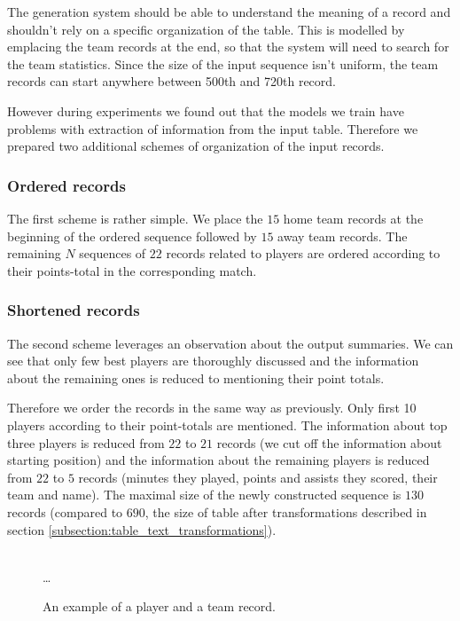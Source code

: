 The generation system should be able to understand the meaning of a record and shouldn't rely on a specific organization of the table. This is modelled by emplacing the team records at the end, so that the system will need to search for the team statistics. Since the size of the input sequence isn't uniform, the team records can start anywhere between 500th and 720th record.

However during experiments we found out that the models we train have problems with extraction of information from the input table. Therefore we prepared two additional schemes of organization of the input records.

\subsubsection{Ordered records} \label{subsubsection:ordered_records}

The first scheme is rather simple. We place the $15$ home team records at the beginning of the ordered sequence followed by $15$ away team records. The remaining $N$ sequences of $22$ records related to players are ordered according to their points-total in the corresponding match.

\subsubsection{Shortened records} \label{subsubsection:shortened records}

The second scheme leverages an observation about the output summaries. We can see that only few best players are thoroughly discussed and the information about the remaining ones is reduced to mentioning their point totals.

Therefore we order the records in the same way as previously. Only first 10 players according to their point-totals are mentioned. The information about top three players is reduced from $22$ to $21$ records (we cut off the information about starting position) and the information about the remaining players is reduced from $22$ to $5$ records (minutes they played, points and assists they scored, their team and name). The maximal size of the newly constructed sequence is $130$ records (compared to $690$, the size of table after transformations described in section \ref{subsection:table_text_transformations}).


\begin{figure}[!h]
    \centering
    \usetikzlibrary{shapes.multipart}
    \\ \dots
    \caption{An example of a player and a team record.} \label{figure:record_example}
\end{figure}

